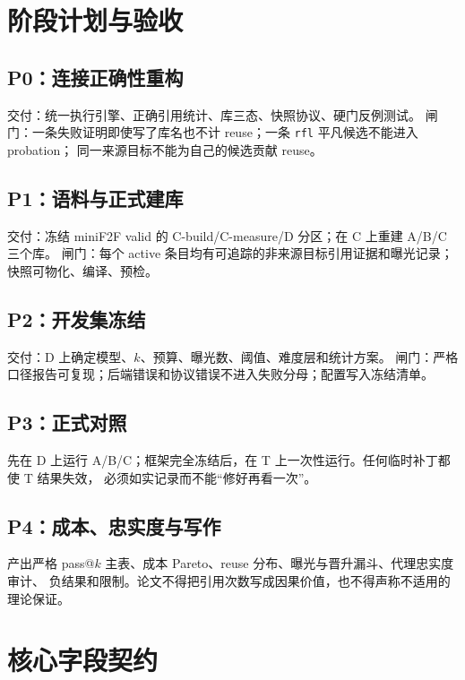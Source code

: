 \documentclass[UTF8,a4paper,11pt,fontset=windows]{ctexart}
\newcommand{\code}[1]{\texttt{\small #1}}
\begin{document}
\section{阶段计划与验收}

\subsection{P0：连接正确性重构}

交付：统一执行引擎、正确引用统计、库三态、快照协议、硬门反例测试。
闸门：一条失败证明即使写了库名也不计 reuse；一条 \code{rfl} 平凡候选不能进入 probation；
同一来源目标不能为自己的候选贡献 reuse。

\subsection{P1：语料与正式建库}

交付：冻结 miniF2F valid 的 C-build/C-measure/D 分区；在 C 上重建 A/B/C 三个库。
闸门：每个 active 条目均有可追踪的非来源目标引用证据和曝光记录；快照可物化、编译、预检。

\subsection{P2：开发集冻结}

交付：D 上确定模型、$k$、预算、曝光数、阈值、难度层和统计方案。
闸门：严格口径报告可复现；后端错误和协议错误不进入失败分母；配置写入冻结清单。

\subsection{P3：正式对照}

先在 D 上运行 A/B/C；框架完全冻结后，在 T 上一次性运行。任何临时补丁都使 T 结果失效，
必须如实记录而不能“修好再看一次”。

\subsection{P4：成本、忠实度与写作}

产出严格 pass@$k$ 主表、成本 Pareto、reuse 分布、曝光与晋升漏斗、代理忠实度审计、
负结果和限制。论文不得把引用次数写成因果价值，也不得声称不适用的理论保证。

\appendix
\section{核心字段契约}
\end{document}
